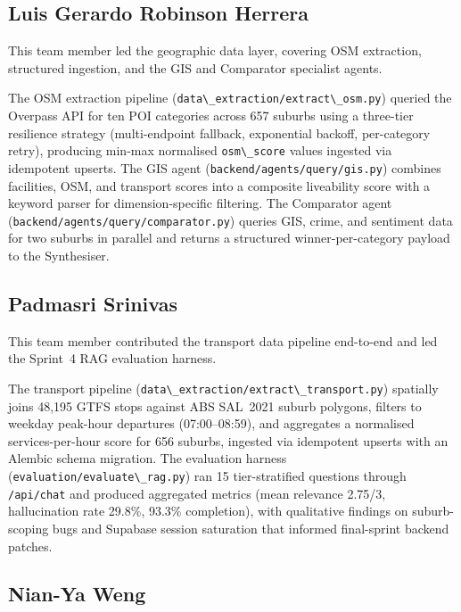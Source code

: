 \documentclass[11pt,a4paper]{article}
\newcommand{\passthrough}[1]{#1}
\begin{document}
\subsection{Luis Gerardo Robinson Herrera}\label{luis-gerardo-robinson-herrera}

This team member led the geographic data layer, covering OSM extraction, structured ingestion, and the GIS and Comparator specialist agents.

The OSM extraction pipeline (\passthrough{\lstinline!data\_extraction/extract\_osm.py!}) queried the Overpass API for ten POI categories across 657 suburbs using a three-tier resilience strategy (multi-endpoint fallback, exponential backoff, per-category retry), producing min-max normalised \passthrough{\lstinline!osm\_score!} values ingested via idempotent upserts. The GIS agent (\passthrough{\lstinline!backend/agents/query/gis.py!}) combines facilities, OSM, and transport scores into a composite liveability score with a keyword parser for dimension-specific filtering. The Comparator agent (\passthrough{\lstinline!backend/agents/query/comparator.py!}) queries GIS, crime, and sentiment data for two suburbs in parallel and returns a structured winner-per-category payload to the Synthesiser.

\subsection{Padmasri Srinivas}\label{padmasri-srinivas}

This team member contributed the transport data pipeline end-to-end and led the Sprint~4 RAG evaluation harness.

The transport pipeline (\passthrough{\lstinline!data\_extraction/extract\_transport.py!}) spatially joins 48,195 GTFS stops against ABS SAL~2021 suburb polygons, filters to weekday peak-hour departures (07:00--08:59), and aggregates a normalised services-per-hour score for 656 suburbs, ingested via idempotent upserts with an Alembic schema migration. The evaluation harness (\passthrough{\lstinline!evaluation/evaluate\_rag.py!}) ran 15 tier-stratified questions through \passthrough{\lstinline!/api/chat!} and produced aggregated metrics (mean relevance 2.75/3, hallucination rate 29.8\%, 93.3\% completion), with qualitative findings on suburb-scoping bugs and Supabase session saturation that informed final-sprint backend patches.

\subsection{Nian-Ya Weng}\label{nian-ya-weng}
\end{document}
